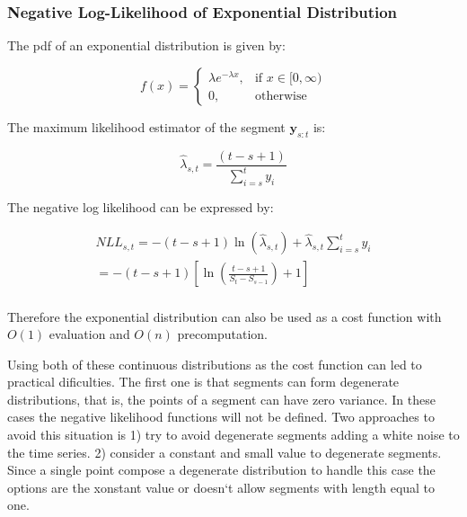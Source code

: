 \subsubsection{Negative Log-Likelihood of Exponential Distribution}

The pdf of an exponential distribution is given by:

\begin{equation}
    f(x) = 
    \begin{cases}
        \lambda e^{- \lambda x}, & \text{if } x \in [0, \infty) \\
        0, & \text{otherwise}
    \end{cases}
\end{equation}

The maximum likelihood estimator of the segment $\mathbf{y}_{s : t}$ is:

\begin{equation}
    \widehat{\lambda}_{s, t} = \frac{(t - s + 1)}{\sum \limits_{i = s}^{t} y_{i}}
\end{equation}

The negative log likelihood can be expressed by:

\begin{equation}
    \begin{aligned}
        NLL_{s, t} = - (t - s + 1) \ln(\widehat{\lambda}_{s, t}) + \widehat{\lambda}_{s, t} \sum \limits_{i = s}^{t} y_{i} \\
        = - (t - s + 1) \left[ \ln \left( \frac{t - s + 1}{S_{t} - S_{s - 1}} \right) + 1 \right] \\
    \end{aligned}
\end{equation}

Therefore the exponential distribution can also be used as a cost function with $O(1)$ evaluation and $O(n)$ precomputation.

Using both of these continuous distributions as the cost function can led to practical dificulties. The first one is that segments can form degenerate distributions, that is, the points of a segment can have zero variance. In these cases the negative likelihood functions will not be defined. Two approaches to avoid this situation is 1) try to avoid degenerate segments adding a white noise to the time series. 2) consider a constant and small value to degenerate segments. Since a single point compose a degenerate distribution to handle this case the options are the xonstant value or doesn`t allow segments with length equal to one.

